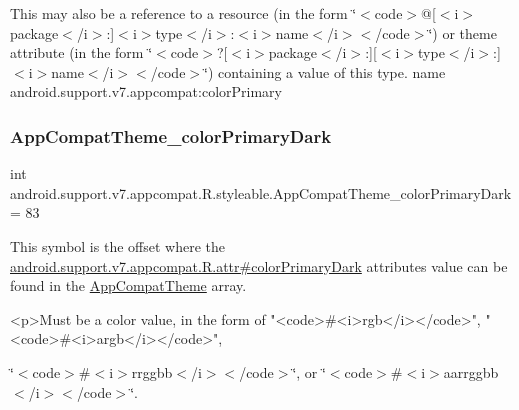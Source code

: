 This may also be a reference to a resource (in the form \char`\"{}$<$code$>$@\mbox{[}$<$i$>$package$<$/i$>$\+:\mbox{]}$<$i$>$type$<$/i$>$\+:$<$i$>$name$<$/i$>$$<$/code$>$\char`\"{}) or theme attribute (in the form \char`\"{}$<$code$>$?\mbox{[}$<$i$>$package$<$/i$>$\+:\mbox{]}\mbox{[}$<$i$>$type$<$/i$>$\+:\mbox{]}$<$i$>$name$<$/i$>$$<$/code$>$\char`\"{}) containing a value of this type.  name android.\+support.\+v7.\+appcompat\+:color\+Primary \mbox{\label{classandroid_1_1support_1_1v7_1_1appcompat_1_1R_1_1styleable_af91ab112f2b33d3628adc9f30b24ba98}} 
\subsubsection{\texorpdfstring{App\+Compat\+Theme\+\_\+color\+Primary\+Dark}{AppCompatTheme\_colorPrimaryDark}}
{\footnotesize\ttfamily int android.\+support.\+v7.\+appcompat.\+R.\+styleable.\+App\+Compat\+Theme\+\_\+color\+Primary\+Dark = 83\hspace{0.3cm}{\ttfamily [static]}}

This symbol is the offset where the \hyperlink{classandroid_1_1support_1_1v7_1_1appcompat_1_1R_1_1attr_a0efae796c8c67d83a21ff5aeb199c447}{android.\+support.\+v7.\+appcompat.\+R.\+attr\#color\+Primary\+Dark} attribute\textquotesingle{}s value can be found in the \hyperlink{classandroid_1_1support_1_1v7_1_1appcompat_1_1R_1_1styleable_a5c42f89e8a410c323be34208d75c430b}{App\+Compat\+Theme} array.

\begin{DoxyVerb}      <p>Must be a color value, in the form of "<code>#<i>rgb</i></code>", "<code>#<i>argb</i></code>",
\end{DoxyVerb}
 \char`\"{}$<$code$>$\#$<$i$>$rrggbb$<$/i$>$$<$/code$>$\char`\"{}, or \char`\"{}$<$code$>$\#$<$i$>$aarrggbb$<$/i$>$$<$/code$>$\char`\"{}. 

